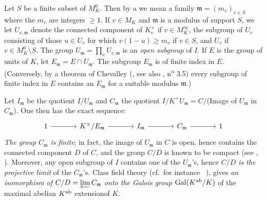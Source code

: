 Let $S$ be a finite subset of $M_K^0$.
\dpage
Then by a  we mean a family $\mathfrak{m} =
(m_v)_{v\in S}$ where the $m_v$ are integers $\ge 1$.  If $v \in M_K$ and
$\mathfrak{m}$ is a modulus of support $S$, we let $U_{v, \mathfrak{m}}$%
 denote the connected component of
$K_v^\times$ if $v \in M_K^\infty$, the subgroup of $U_v$ consisting of those
$u \in U_v$ for which $v(1-u) \ge m_v$ if $v \in S$, and $U_v$ if $v \in M_K^0
\setminus S$. The group $U_{\mathfrak{m}} = \prod_{v} U_{v, \mathfrak{m}}$ is
an \emph{open subgroup} of $I$.  If $E$ is the group of units of $K$, let
$E_{\mathfrak{m}} = E \cap U_{\mathfrak{m}}$. The
subgroup $E_{\mathfrak{m}}$ is of finite index in $E$.
(Conversely, by a theorem of Chevalley (\cite{8}, see also \cite{24},
n\textsuperscript{o} 3.5) every subgroup of finite index in $E$ contains an
$E_{\mathfrak{m}}$ for a suitable modulus $\mathfrak{m}$.)

Let $I_{\mathfrak{m}}$ be the quotient
$I/U_{\mathfrak{m}}$ and $C_{\mathfrak{m}}$ the
quotient $I/K^\times U_{\mathfrak{m}} = C/$(Image of $U_{\mathfrak{m}}$ in
$C_{\mathfrak{m}}$). One then has the exact sequence:
\[\begin{tikzcd}[sep=large]
	1 \rar & K^\times/E_{\mathfrak{m}} \rar & I_{\mathfrak{m}} \rar &
	C_{\mathfrak{m}} \rar & 1
\end{tikzcd}\]
\emph{The group $C_{\mathfrak{m}}$ is finite}; in fact, the image of
$U_{\mathfrak{m}}$ in $C$ is open, hence contains the connected component
$D$ of $C$, and the group $C/D$ is known to be compact (see
\cite{13}, \cite{44}).  Moreover, any open subgroup of $I$ contains one of the
$U_{\mathfrak{m}}$'s, hence \emph{$C/D$ is the projective limit} of the
$C_{\mathfrak{m}}$'s. Class field theory (cf.\ for instance
\citeauthor{6}~\cite{6}), gives \emph{an isomorphism of $C/D = \varprojlim
C_{\mathfrak{m}}$ onto the Galois group $\operatorname{Gal}(K^{\mathrm{ab}}/K)$} of the maximal
abelian $K^{\mathrm{ab}}$ extension\break of $K$.

